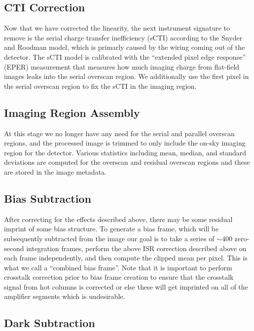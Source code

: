 \documentclass[SE,authoryear,lsstdraft,toc]{lsstdoc}
\begin{document}
\subsection{CTI Correction}
\label{sec:cticorr}

Now that we have corrected the linearity, the next instrument signature to remove is the serial charge transfer inefficiency (sCTI) according to the Snyder and Roodman model, which is primarly caused by the wiring coming out of the detector.
The sCTI model is calibrated with the ``extended pixel edge response'' (EPER) measurement that measures how much imaging charge from flat-field images leaks into the serial overscan region.
We additionally use the first pixel in the serial overscan region to fix the sCTI in the imaging region.

\subsection{Imaging Region Assembly}
\label{sec:assembly}

At this stage we no longer have any need for the serial and parallel overscan regions, and the processed image is trimmed to only include the on-sky imaging region for the detector.
Various statistics including mean, median, and standard deviations are computed for the overscan and residual overscan regions and these are stored in the image metadata.

\subsection{Bias Subtraction}
\label{sec:biascorr}

After correcting for the effects described above, there may be some residual imprint of some bias structure.
To generate a bias frame, which will be subsequently subtracted from the image our goal is to take a series of $\sim400$ zero-second integration frames, perform the above ISR correction described above on each frame independently, and then compute the clipped mean per pixel.
This is what we call a ``combined bias frame''.
Note that it is important to perform crosstalk correction prior to bias frame creation to ensure that the crosstalk signal from hot columns is corrected or else these will get imprinted on all of the amplifier segments which is undesirable.

\subsection{Dark Subtraction}
\label{sec:darkcorr}
\end{document}
